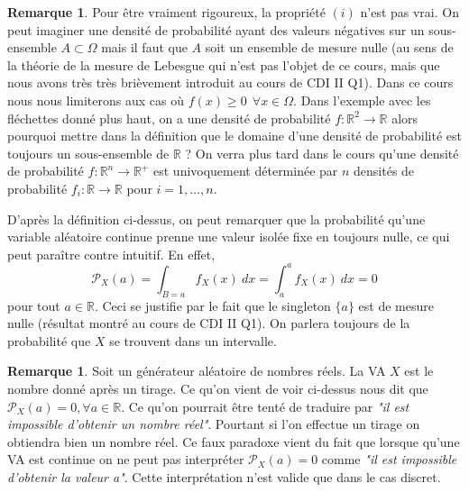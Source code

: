 \documentclass[a4paper,12pt]{report}
\theoremstyle{definition}
\newcommand{\ra}{\rightarrow}
\newcommand{\R}{\mathbb{R}}
\renewcommand{\(}{\left(}
\renewcommand{\)}{\right)}
\renewcommand{\P}{\mathcal{P}}
\newtheorem{rmk}[thm]{Remarque}
\begin{document}
        
        
        \begin{rmk}
            Pour être vraiment rigoureux, la propriété $(i)$ n'est pas vrai. On peut imaginer une densité de probabilité ayant des valeurs négatives sur un sous-ensemble $A\subset\Omega$ mais il faut que $A$ soit un ensemble de mesure nulle (au sens de la théorie de la mesure de Lebesgue qui n'est pas l'objet de ce cours, mais que nous avons très très brièvement introduit au cours de CDI II Q1). Dans ce cours nous nous limiterons aux cas où $f(x) \geq 0 ~~\forall x\in\Omega$. Dans l'exemple avec les fléchettes donné plus haut, on a une densité de probabilité $f:\R^2\ra\R$ alors pourquoi mettre dans la définition que le domaine d'une densité de probabilité est toujours un sous-ensemble de $\R$ ? On verra plus tard dans le cours qu'une densité de probabilité $f:\R^n\ra\R^{+}$ est univoquement déterminée par $n$ densités de probabilité $f_i:\R\ra\R$ pour $i=1,\dots,n$.
        \end{rmk}
        
        
        D'après la définition ci-dessus, on peut remarquer que la probabilité qu'une variable aléatoire continue prenne une valeur isolée fixe en toujours nulle, ce qui peut paraître contre intuitif. En effet,
        $$\P_X(a) = \int_{B = {a}} f_X(x)~dx = \int_a^a f_X(x)~dx = 0$$
        pour  tout $a\in\R$. Ceci se justifie par le fait que le singleton $\{a\}$ est de mesure nulle (résultat montré au cours de CDI II Q1). On parlera toujours de la probabilité que $X$ se trouvent dans un intervalle.
        
        \begin{rmk}
            Soit un générateur aléatoire de nombres réels. La VA $X$ est le nombre donné après un tirage. Ce qu'on vient de voir ci-dessus nous dit que $\P_X(a) = 0, \forall a\in \R$. Ce qu'on pourrait être tenté de traduire par \textit{"il est impossible d'obtenir un nombre réel"}. Pourtant si l'on effectue un tirage on obtiendra bien un nombre réel. Ce faux paradoxe vient du fait que lorsque qu'une VA est continue on ne peut pas interpréter $\P_X(a) = 0$ comme \textit{"il est impossible d'obtenir la valeur a"}. Cette interprétation n'est valide que dans le cas discret.
        \end{rmk}
        
\end{document}
